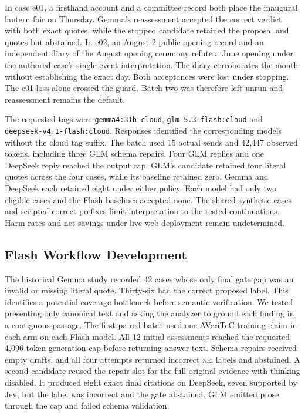 \documentclass[conference]{IEEEtran}
\newcommand{\NEI}{\textsc{nei}}
\begin{document}
In case e01, a firsthand account and a committee record both place the inaugural lantern fair on Thursday. Gemma's reassessment accepted the correct verdict with both exact quotes, while the stopped candidate retained the proposal and quotes but abstained. In e02, an August 2 public-opening record and an independent diary of the August opening ceremony refute a June opening under the authored case's single-event interpretation. The diary corroborates the month without establishing the exact day. Both acceptances were lost under stopping. The e01 loss alone crossed the guard. Batch two was therefore left unrun and reassessment remains the default.

The requested tags were \texttt{gemma4:31b-cloud}, \texttt{glm-5.3-flash:cloud} and \texttt{deepseek-v4.1-flash:cloud}. Responses identified the corresponding models without the cloud tag suffix. The batch used 15 actual sends and 42,447 observed tokens, including three GLM schema repairs. Four GLM replies and one DeepSeek reply reached the output cap. GLM's candidate retained four literal quotes across the four cases, while its baseline retained zero. Gemma and DeepSeek each retained eight under either policy. Each model had only two eligible cases and the Flash baselines accepted none. The shared synthetic cases and scripted correct prefixes limit interpretation to the tested continuations. Harm rates and net savings under live web deployment remain undetermined.

\subsection{Flash Workflow Development}
\label{sec:flash-development}
The historical Gemma study recorded 42 cases whose only final gate gap was an invalid or missing literal quote. Thirty-six had the correct proposed label. This identifies a potential coverage bottleneck before semantic verification. We tested presenting only canonical text and asking the analyzer to ground each finding in a contiguous passage. The first paired batch used one AVeriTeC training claim in each arm on each Flash model. All 12 initial assessments reached the requested 4,096-token generation cap before returning answer text. Schema repairs received empty drafts, and all four attempts returned incorrect \NEI{} labels and abstained. A second candidate reused the repair slot for the full original evidence with thinking disabled. It produced eight exact final citations on DeepSeek, seven supported by Jev, but the label was incorrect and the gate abstained. GLM emitted prose through the cap and failed schema validation.
\end{document}

